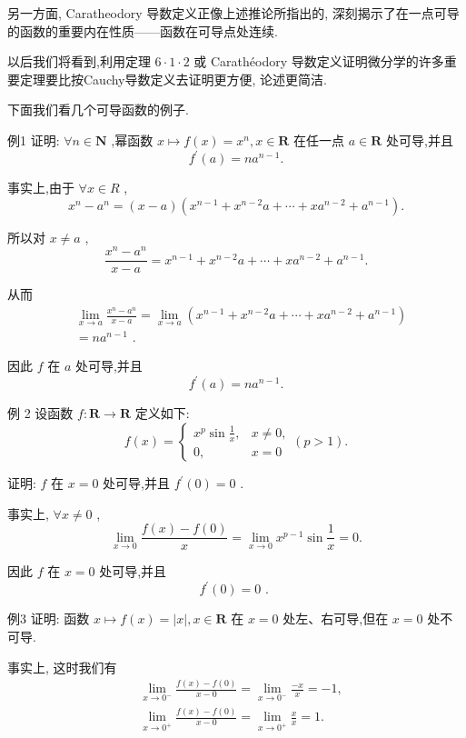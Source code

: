 另一方面, Caratheodory 导数定义正像上述推论所指出的, 深刻揭示了在一点可导的函数的重要内在性质——函数在可导点处连续.

以后我们将看到,利用定理 $6 \cdot  1 \cdot  2$ 或 Carathéodory 导数定义证明微分学的许多重要定理要比按Cauchy导数定义去证明更方便, 论述更简洁.

下面我们看几个可导函数的例子.

例1 证明: $\forall n \in  \mathbf{N}$ ,幂函数 $x \mapsto  f\left( x\right)  = {x}^{n},x \in  \mathbf{R}$ 在任一点 $a \in  \mathbf{R}$ 处可导,并且
$${f}^{\prime }\left( a\right)  = n{a}^{n - 1}.$$

事实上,由于 $\forall x \in  R$ ,
$${x}^{n} - {a}^{n} = \left( {x - a}\right) \left( {{x}^{n - 1} + {x}^{n - 2}a + \cdots  + x{a}^{n - 2} + {a}^{n - 1}}\right) .$$

所以对 $x \neq  a$ ,
$$\frac{{x}^{n} - {a}^{n}}{x - a} = {x}^{n - 1} + {x}^{n - 2}a + \cdots  + x{a}^{n - 2} + {a}^{n - 1}.$$

从而
\begin{align*}
	&\mathop{\lim }\limits_{{x \rightarrow  a}}\frac{{x}^{n} - {a}^{n}}{x - a} = \mathop{\lim }\limits_{{x \rightarrow  a}}\left( {{x}^{n - 1} + {x}^{n - 2}a + \cdots  + x{a}^{n - 2} + {a}^{n - 1}}\right)\\
	&= n{a}^{n - 1}\text{ . }
\end{align*}

因此 $f$ 在 $a$ 处可导,并且
$${f}^{\prime }\left( a\right)  = n{a}^{n - 1}.$$

例 2 设函数 $f : \mathbf{R} \rightarrow  \mathbf{R}$ 定义如下:
$$f\left( x\right)  = \left\{  {\begin{array}{ll} {x}^{p}\sin \frac{1}{x}, & x \neq  0, \\  0, & x = 0 \end{array}\left( {p > 1}\right) .}\right.$$

证明: $f$ 在 $x = 0$ 处可导,并且 ${f}^{\prime }\left( 0\right)  = 0$ .

事实上, $\forall x \neq  0$ ,
$$\mathop{\lim }\limits_{{x \rightarrow  0}}\frac{f\left( x\right)  - f\left( 0\right) }{x} = \mathop{\lim }\limits_{{x \rightarrow  0}}{x}^{p - 1}\sin \frac{1}{x} = 0.$$

因此 $f$ 在 $x = 0$ 处可导,并且
$${f}^{\prime }\left( 0\right)  = 0\text{ . }$$

例3 证明: 函数 $x \mapsto  f\left( x\right)  = \left| x\right| ,x \in  \mathbf{R}$ 在 $x = 0$ 处左、右可导,但在 $x = 0$ 处不可导.

事实上, 这时我们有
\begin{align*}
	&\mathop{\lim }\limits_{{x \rightarrow  {0}^{ - }}}\frac{f\left( x\right)  - f\left( 0\right) }{x - 0} = \mathop{\lim }\limits_{{x \rightarrow  {0}^{ - }}}\frac{-x}{x} =  - 1,\\
	&\mathop{\lim }\limits_{{x \rightarrow  {0}^{ + }}}\frac{f\left( x\right)  - f\left( 0\right) }{x - 0} = \mathop{\lim }\limits_{{x \rightarrow  {0}^{ + }}}\frac{x}{x} = 1.
\end{align*}


